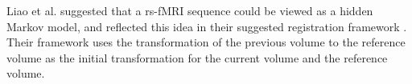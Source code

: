 Liao et al. suggested that a rs-fMRI sequence could be viewed as a hidden Markov model, and reflected this idea in their suggested registration framework \cite{Liao2016}. Their framework uses the transformation of the previous volume to the reference volume as the initial transformation for the current volume and the reference volume. 



%
%
%
%
%
